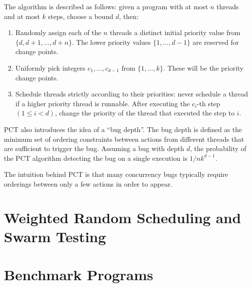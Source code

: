 The algorithm is described as follows\cite{burckhardt2010}: given a program with
at most $n$ threads and at most $k$ steps, choose a bound $d$, then:

\begin{enumerate}
\item Randomly assign each of the $n$ threads a distinct initial priority value
from $\{d, d + 1, \ldots, d+n\}$. The lower priority values $\{1, \ldots, d−1\}$
are reserved for change points.
\item Uniformly pick integers $c_1, \ldots, c_{d−1}$ from $\{1, \ldots,
k\}$. These will be the priority change points.
\item Schedule threads strictly according to their priorities: never
schedule a thread if a higher priority thread is runnable. After executing the
$c_i$-th step $(1 \leq i < d)$, change the priority of the thread that executed
the step to $i$.
\end{enumerate}

PCT also introduces the idea of a ``bug depth''. The bug depth is defined as the
minimum set of ordering constraints between actions from different threads that
are sufficient to trigger the bug\cite{burckhardt2010}. Assuming a bug with
depth $d$, the probability of the PCT algorithm detecting the bug on a single
execution is $1/nk^{d−1}$.

The intuition behind PCT is that many concurrency bugs typically require
orderings between only a few actions in order to appear.

\section{Weighted Random Scheduling and Swarm Testing}
\label{sec:algorithms-swarm}

\blindtext

\section{Benchmark Programs}
\label{sec:algorithms-sctbench}

\blindtext
